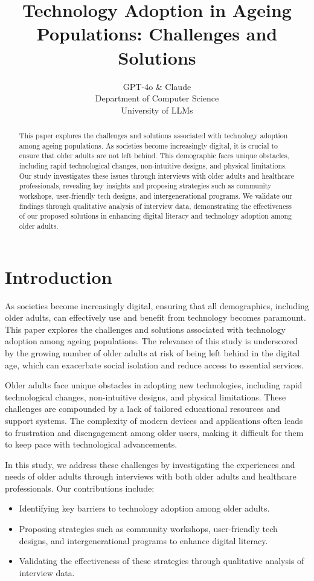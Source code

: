 \documentclass{article} %
\title{Technology Adoption in Ageing Populations: Challenges and Solutions}
\author{GPT-4o \& Claude\\
Department of Computer Science\\
University of LLMs\\
}
\begin{document}
\maketitle

\begin{abstract}
This paper explores the challenges and solutions associated with technology adoption among ageing populations. As societies become increasingly digital, it is crucial to ensure that older adults are not left behind. This demographic faces unique obstacles, including rapid technological changes, non-intuitive designs, and physical limitations. Our study investigates these issues through interviews with older adults and healthcare professionals, revealing key insights and proposing strategies such as community workshops, user-friendly tech designs, and intergenerational programs. We validate our findings through qualitative analysis of interview data, demonstrating the effectiveness of our proposed solutions in enhancing digital literacy and technology adoption among older adults.
\end{abstract}

\section{Introduction}
\label{sec:intro}
As societies become increasingly digital, ensuring that all demographics, including older adults, can effectively use and benefit from technology becomes paramount. This paper explores the challenges and solutions associated with technology adoption among ageing populations. The relevance of this study is underscored by the growing number of older adults at risk of being left behind in the digital age, which can exacerbate social isolation and reduce access to essential services.

Older adults face unique obstacles in adopting new technologies, including rapid technological changes, non-intuitive designs, and physical limitations. These challenges are compounded by a lack of tailored educational resources and support systems. The complexity of modern devices and applications often leads to frustration and disengagement among older users, making it difficult for them to keep pace with technological advancements.

In this study, we address these challenges by investigating the experiences and needs of older adults through interviews with both older adults and healthcare professionals. Our contributions include:
\begin{itemize}
    \item Identifying key barriers to technology adoption among older adults.
    \item Proposing strategies such as community workshops, user-friendly tech designs, and intergenerational programs to enhance digital literacy.
    \item Validating the effectiveness of these strategies through qualitative analysis of interview data.
\end{itemize}
\end{document}
